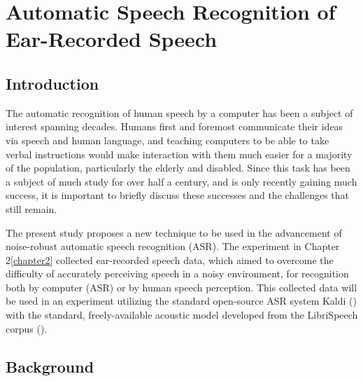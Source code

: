 \documentclass[dissertation,copyright]{uathesis}
\begin{document}



 



\chapter{Automatic Speech Recognition of Ear-Recorded Speech\label{chapter3}}


\section{Introduction}

The automatic recognition of human speech by a computer has been a subject of interest spanning decades.  Humans first and foremost communicate their ideas via speech and human language, and teaching computers to be able to take verbal instructions would make interaction with them much easier for a majority of the population, particularly the elderly and disabled.  Since this task has been a subject of much study for over half a century, and is only recently gaining much success, it is important to briefly discuss these successes and the challenges that still remain.


The present study proposes a new technique to be used in the advancement of noise-robust automatic speech recognition (ASR).
The experiment in Chapter 2\ref{chapter2} collected ear-recorded speech data, which aimed to overcome the difficulty of accurately perceiving speech in a noisy environment, for recognition both by computer (ASR) or by human speech perception.  This collected data will be used in an experiment utilizing the standard open-source ASR system Kaldi (\cite{povey:11}) with the standard, freely-available acoustic model developed from the LibriSpeech corpus (\cite{panayotov:15}).

\section{Background}
\label{chap3:background}
\end{document}
